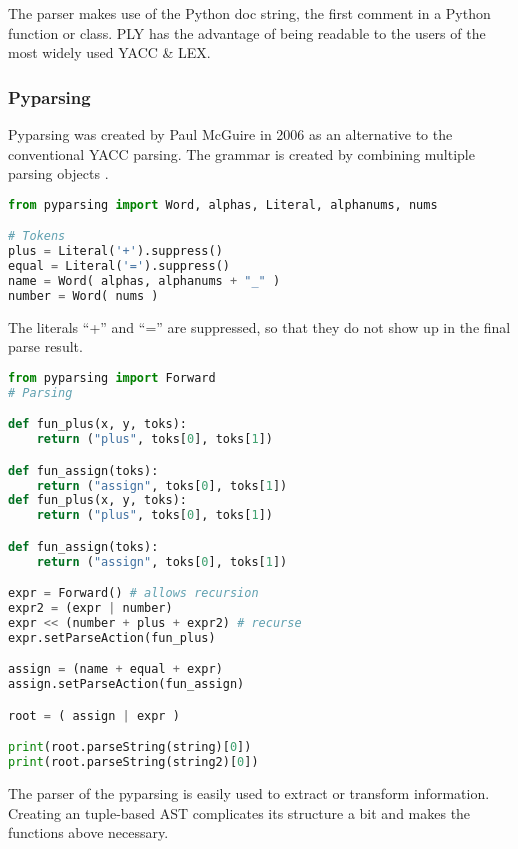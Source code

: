 \documentclass{scrartcl}
\begin{document}
The parser makes use of the Python doc string, the first comment in a Python
function or class. PLY has the advantage of being readable to the users of the
most widely used YACC \& LEX.

\subsubsection{Pyparsing}
\label{sub:pyparsing}
Pyparsing was created by Paul McGuire in 2006 as an alternative to the
conventional YACC parsing. The grammar is created by combining multiple parsing
objects \cite{website:pyparser}.

\begin{lstlisting}[language=py,showstringspaces=false,caption=Pyparsing Token]
from pyparsing import Word, alphas, Literal, alphanums, nums

# Tokens
plus = Literal('+').suppress()
equal = Literal('=').suppress()
name = Word( alphas, alphanums + "_" )
number = Word( nums )
\end{lstlisting}

The literals ``+'' and ``='' are suppressed, so that they do not show up in the
final parse result.

\begin{lstlisting}[language=py,showstringspaces=false,caption=Pyparsing Parser]
from pyparsing import Forward
# Parsing

def fun_plus(x, y, toks):
    return ("plus", toks[0], toks[1])

def fun_assign(toks):
    return ("assign", toks[0], toks[1])
def fun_plus(x, y, toks):
    return ("plus", toks[0], toks[1])

def fun_assign(toks):
    return ("assign", toks[0], toks[1])

expr = Forward() # allows recursion
expr2 = (expr | number)
expr << (number + plus + expr2) # recurse
expr.setParseAction(fun_plus)

assign = (name + equal + expr)
assign.setParseAction(fun_assign)

root = ( assign | expr )

print(root.parseString(string)[0])
print(root.parseString(string2)[0])
\end{lstlisting}

The parser of the pyparsing is easily used to extract or transform information.
Creating an tuple-based AST complicates its structure a bit and makes the functions above
necessary.
\end{document}

